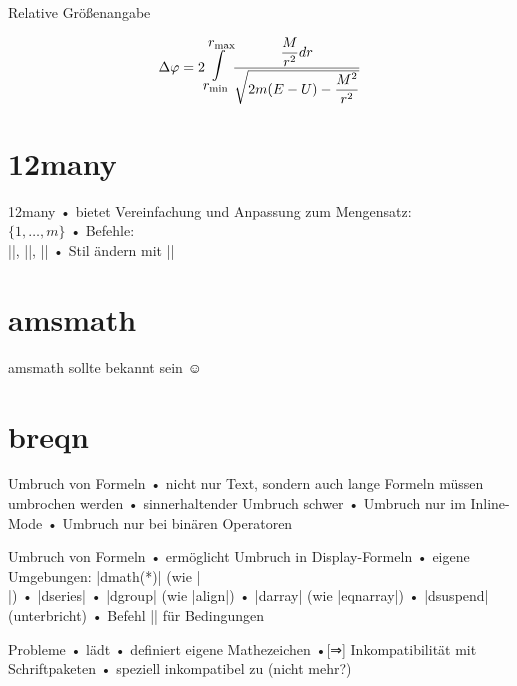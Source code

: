 \begin{frame}[fragile]{Relative Größenangabe}
\begin{LTXexample}[pos=b]
\newcommand\largeint{\mathlarger{\mathlarger{\mathlarger{\int}}}}
\[\Delta \varphi = 2
\largeint\limits_{r_{\min}}^{r_{\max}} \frac{ \dfrac{M}{r^2} dr} 
{\sqrt{2m (E-U) - \dfrac{M^2}{r^2}}}
\]
\end{LTXexample}
\end{frame}

\section{12many}
\begin{frame}[fragile]{12many}
•  bietet Vereinfachung und Anpassung zum Mengensatz:\\%
$\{1, \dots, m\}$
• Befehle:\\
||, ||, ||
• Stil ändern mit ||
\•
\begin{LTXexample}
\end{LTXexample}
\end{frame}
\section{amsmath}
\begin{frame}{amsmath}
sollte bekannt sein ☺
\end{frame}

\section{breqn}
\begin{frame}{Umbruch von Formeln}
• nicht nur Text, sondern auch lange Formeln müssen umbrochen werden
• sinnerhaltender Umbruch schwer
• Umbruch nur im Inline-Mode
• Umbruch nur bei binären Operatoren
\•
\end{frame}

\begin{frame}[fragile]{Umbruch von Formeln}
•  ermöglicht Umbruch in Display-Formeln
• eigene Umgebungen: |dmath(*)| (wie |\[ \]|)
• |dseries| 
• |dgroup| (wie |align|)
• |darray| (wie |eqnarray|)
• |dsuspend| (unterbricht)
• Befehl |\condition| für Bedingungen
\•
\end{frame}

\begin{frame}[fragile]{Probleme}
•  lädt 
•  definiert eigene Mathezeichen
•[⇒] Inkompatibilität mit Schriftpaketen
• speziell \alert{inkompatibel} zu  (nicht mehr?)
\•
\end{frame}

